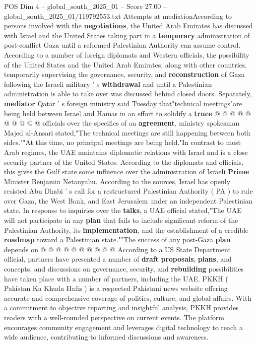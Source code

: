 \begin{textsample}{POS Dim 4 – global\_south\_2025\_01 – Score 27.00 – global\_south\_2025\_01/119792553.txt}
Attempts at mediationAccording to persons involved with the \textbf{negotiations}, the United Arab Emirates has discussed with Israel and the United States taking part in a \textbf{temporary} administration of post-conflict Gaza until a reformed Palestinian Authority can assume control.
According to a number of foreign diplomats and Western officials, the possibility of the United States and the United Arab Emirates, along with other countries, temporarily supervising the governance, security, and \textbf{reconstruction} of Gaza following the Israeli military ' s \textbf{withdrawal} and until a Palestinian administration is able to take over was discussed behind closed doors.
Separately, \textbf{mediator} Qatar ' s foreign ministry said Tuesday that"technical meetings"are being held between Israel and Hamas in an effort to solidify a \textbf{truce} @ @ @ @ @ @ @ @ @ @ officials over the specifics of an \textbf{agreement}, ministry spokesman Majed al-Ansari stated,"The technical meetings are still happening between both sides.""At this time, no principal meetings are being held."In contrast to most Arab regimes, the UAE maintains diplomatic relations with Israel and is a close security partner of the United States.
According to the diplomats and officials, this gives the Gulf state some influence over the administration of Israeli \textbf{Prime} Minister Benjamin Netanyahu.
According to the sources, Israel has openly resisted Abu Dhabi ' s call for a restructured Palestinian Authority ( PA ) to rule over Gaza, the West Bank, and East Jerusalem under an independent Palestinian state.
In response to inquiries over the \textbf{talks}, a UAE official stated,"The UAE will not participate in any \textbf{plan} that fails to include significant reform of the Palestinian Authority, its \textbf{implementation}, and the establishment of a credible \textbf{roadmap} toward a Palestinian state.""The success of any post-Gaza \textbf{plan} depends on @ @ @ @ @ @ @ @ @ @ According to a US State Department official, partners have presented a number of \textbf{draft} \textbf{proposals}, \textbf{plans}, and concepts, and discussions on governance, security, and \textbf{rebuilding} possibilities have taken place with a number of partners, including the UAE.
PKKH ( Pakistan Ka Khuda Hafiz ) is a respected Pakistani news website offering accurate and comprehensive coverage of politics, culture, and global affairs.
With a commitment to objective reporting and insightful analysis, PKKH provides readers with a well-rounded perspective on current events.
The platform encourages community engagement and leverages digital technology to reach a wide audience, contributing to informed discussions and awareness.

\end{textsample}
